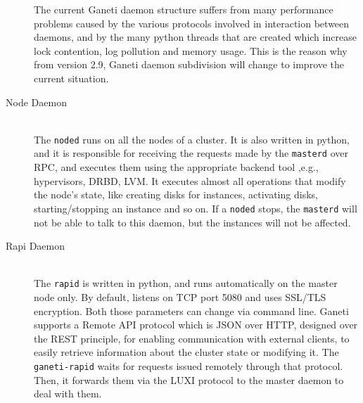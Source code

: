 \begin{description}
    The current Ganeti daemon structure suffers from many performance problems
    caused by the various protocols involved in interaction between daemons, and
    by the many python threads that are created which increase lock contention,
    log pollution and memory usage. This is the reason why from version 2.9,
    Ganeti daemon subdivision will change to improve the current situation.
  \item[Node Daemon] \hfill \\
    The \texttt{noded} runs on all the nodes of a cluster. It is also written in
    python, and it is responsible for receiving the requests made by the
    \texttt{masterd} over RPC, and executes them using the appropriate backend
    tool ,e.g., hypervisors, DRBD, LVM. It executes almost all operations that
    modify the node's state, like creating disks for instances, activating disks,
    starting/stopping an instance and so on. If a \texttt{noded} stops, the
    \texttt{masterd} will not be able to talk to this daemon, but the instances
    will not be affected.
  \item[Rapi Daemon] \hfill \\
    The \texttt{rapid} is written in python, and runs automatically on the master
    node only. By default, listens on TCP port 5080 and uses SSL/TLS encryption.
    Both those parameters can change via command line. Ganeti supports a Remote
    API protocol which is JSON over HTTP, designed over the REST principle, for
    enabling communication with external clients, to easily retrieve information
    about the cluster state or modifying it. The \texttt{ganeti-rapid} waits for
    requests issued remotely through that protocol. Then, it forwards them via
    the LUXI protocol to the master daemon to deal with them.


\end{description}

